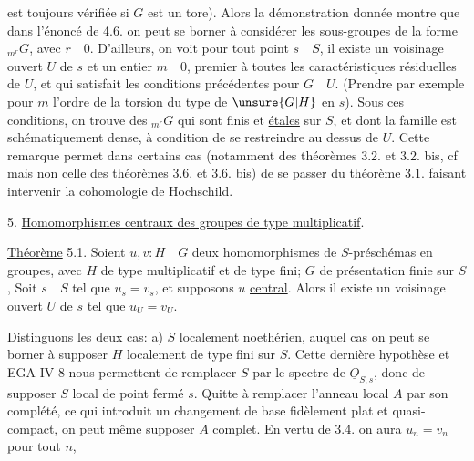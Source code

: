 est toujours vérifiée si $G$ est un tore). Alors la démonstration donnée
montre que dans l'énoncé de 4.6.  on peut se borner à considérer les
sous-groupes de la forme ${}_{m^r}G$, avec $r\quad 0$. D'ailleurs, on voit 
  pour tout point $s\quad S$, il existe un voisinage ouvert $U$ de $s$ 
et un entier $m\quad 0$, premier à toutes les caractéristiques 
résiduelles de $U$, et qui satisfait les conditions précédentes pour $G\quad U$.
(Prendre par exemple pour $m$ l'ordre de la torsion du type de $\unsure{G|H}$ 
en $s$). Sous ces conditions, on trouve des ${}_{m^r}G$ qui sont finis et
\uline{étales} sur $S$, et dont la famille est schématiquement dense, à condition
de se restreindre au dessus de $U$. Cette remarque permet dans certains
cas (notamment   des théorèmes 3.2. et 3.2. bis, cf
mais non celle des théorèmes 3.6. et 3.6. bis) de se passer du théorème 3.1. faisant intervenir la cohomologie de Hochschild. 

5. \uline{Homomorphismes centraux des groupes de type multiplicatif}.

\uline{Théorème} 5.1. Soient $u,v:H\quad G$ deux homomorphismes de $S$-préschémas en groupes, avec $H$ de type multiplicatif et de type fini;  $G$ de présentation finie sur $S$, 
Soit $s\quad S$ tel que $u_s=v_s$, et supposons $u$ \uline{central}. Alors il existe
un voisinage ouvert $U$ de $s$ tel que $u_U=v_U$.

Distinguons les deux cas: a) $S$ localement noethérien, auquel cas
on peut se borner à supposer $H$ localement de type fini sur $S$. Cette
dernière hypothèse et EGA IV 8 nous permettent de remplacer $S$ par
le spectre de $\underline{O}_{S,s}$, donc de supposer $S$ local de point fermé $s$. Quitte
à remplacer l'anneau local $A$ par son complété, ce qui introduit un
changement de base fidèlement plat et quasi-compact, on peut même supposer $A$ complet. En vertu de 3.4. on aura $u_n=v_n$ pour tout $n$,



